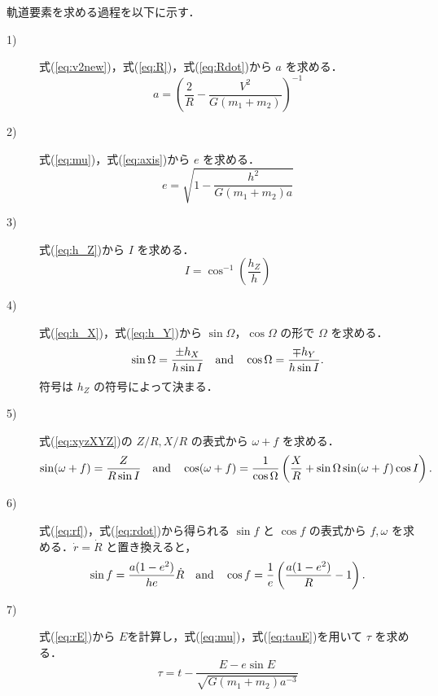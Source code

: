 \documentclass[11pt,a4paper,oneside,onecolumn]{jreport}
\begin{document}
軌道要素を求める過程を以下に示す．

\begin{description}
\item[1)] 式(\ref{eq:v2new})，式(\ref{eq:R})，式(\ref{eq:Rdot})から $a$ を求める．
\begin{equation}
a = \left( \frac{2}{R} -\frac{V^2}{G (m_1 + m_2)} \right)^{-1} \label{eq:axis}
\end{equation}
\item[2)] 式(\ref{eq:mu})，式(\ref{eq:axis})から $e$ を求める．
\begin{equation}
e = \sqrt{1- \frac{h^2}{G (m_1 + m_2) a}} \label{eq:ecc}
\end{equation}
\item[3)] 式(\ref{eq:h_Z})から $I$ を求める．
\begin{equation}
I = \cos^{-1} \left( \frac{h_Z}{h} \right) \label{eq:inc}
\end{equation}
\item[4)] 式(\ref{eq:h_X})，式(\ref{eq:h_Y})から $\sin \Omega，\cos \Omega$ の形で $\Omega$ を求める．
\begin{equation}
\sin \Omega = \frac{\pm h_X}{h \sin I} \quad {\rm and} \quad \cos \Omega = \frac{\mp h_Y}{h \sin I}. \label{eq:OMEGA}
\end{equation}
符号は $h_Z$ の符号によって決まる．
\item[5)] 式(\ref{eq:xyzXYZ})の $Z/R, X/R$ の表式から $\omega + f$ を求める．
\begin{equation}
\sin (\omega + f) = \frac{Z}{R \sin I} \quad {\rm and} \quad \cos (\omega + f) = \frac{1}{\cos \Omega} \left( \frac{X}{R} + \sin \Omega \sin (\omega + f) \cos I \right). \label{eq:omega+f}
\end{equation}
\item[6)] 式(\ref{eq:rf})，式(\ref{eq:rdot})から得られる $\sin f$ と $\cos f$ の表式から $f, \omega$ を求める．$\dot{r} = \dot{R}$ と置き換えると，
\begin{equation}
\sin f = \frac{a (1 - e^2)}{h e} \dot{R} \quad {\rm and} \quad \cos f = \frac{1}{e} \left( \frac{a (1 - e^2)}{R} - 1 \right). \label{eq:f}
\end{equation}
\item[7)] 式(\ref{eq:rE})から $E$を計算し，式(\ref{eq:mu})，式(\ref{eq:tauE})を用いて $\tau$ を求める．
\begin{equation}
\tau = t - \frac{E - e \sin E}{\sqrt{G (m_1 + m_2) a^{-3}}} \label{eq:tau}
\end{equation}
\end{description}
\end{document}
